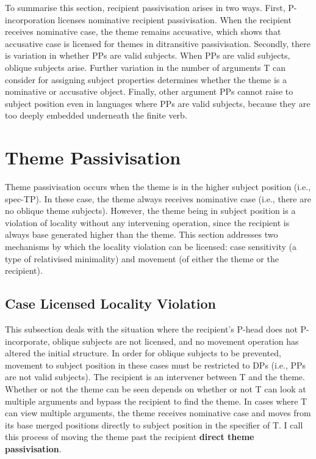 To summarise this section, recipient passivisation arises in two ways. First, P-incorporation licenses nominative recipient passivisation. When the recipient receives nominative case, the theme remains accusative, which shows that accusative case is licensed for themes in ditransitive passivisation. Secondly, there is variation in whether PPs are valid subjects. When PPs are valid subjects, oblique subjects arise. Further variation in the number of arguments T can consider for assigning subject properties determines whether the theme is a nominative or accusative object. Finally, other argument PPs cannot raise to subject position even in languages where PPs are valid subjects, because they are too deeply embedded underneath the finite verb.

\section{Theme Passivisation}
Theme passivisation occurs when the theme is in the higher subject position (i.e., spec-TP). In these case, the theme always receives nominative case (i.e., there are no oblique theme subjects). However, the theme being in subject position is a violation of locality without any intervening operation, since the recipient is always base generated higher than the theme. This section addresses two mechanisms by which the locality violation can be licensed: case sensitivity (a type of relativised minimality) and movement (of either the theme or the recipient).

\subsection{Case Licensed Locality Violation}
This subsection deals with the situation where the recipient's P-head does not P-incorporate, oblique subjects are not licensed, and no movement operation has altered the initial structure. In order for oblique subjects to be prevented, movement to subject position in these cases must be restricted to DPs (i.e., PPs are not valid subjects). The recipient is an intervener between T and the theme. Whether or not the theme can be seen depends on whether or not T can look at multiple arguments and bypass the recipient to find the theme. In cases where T can view multiple arguments, the theme receives nominative case and moves from its base merged positions directly to subject position in the specifier of T. I call this process of moving the theme past the recipient \textbf{direct theme passivisation}.

